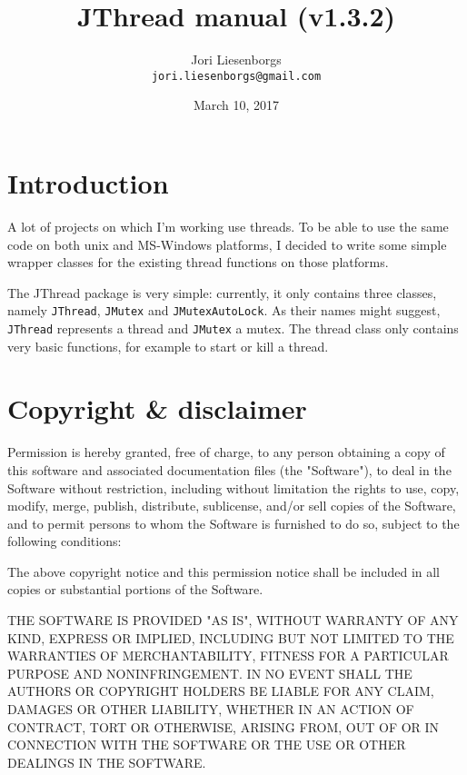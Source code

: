 \documentclass[a4paper,12pt]{article}
\begin{document}
	\title{JThread manual (v1.3.2)}
	\author{Jori Liesenborgs\\
	        {\tt jori.liesenborgs@gmail.com} }
	\date{March 10, 2017}
	\maketitle

	\section{Introduction}

	A lot of projects on which I'm working use threads. To be able to
	use the same code on both unix and MS-Windows platforms, I decided
	to write some simple wrapper classes for the existing thread functions
	on those platforms.

	The JThread package is very simple: currently, it only contains three
	classes, namely {\tt JThread}, {\tt JMutex} and {\tt JMutexAutoLock}. 
	As their names might
	suggest, {\tt JThread} represents a thread and {\tt JMutex} a mutex.
	The thread class only contains very basic functions, for example to
	start or kill a thread.

	\section{Copyright \& disclaimer}

	Permission is hereby granted, free of charge, to any person obtaining a
	copy of this software and associated documentation files (the "Software"),
	to deal in the Software without restriction, including without limitation
	the rights to use, copy, modify, merge, publish, distribute, sublicense,
	and/or sell copies of the Software, and to permit persons to whom the
	Software is furnished to do so, subject to the following conditions:

	The above copyright notice and this permission notice shall be included
	in all copies or substantial portions of the Software.

	THE SOFTWARE IS PROVIDED "AS IS", WITHOUT WARRANTY OF ANY KIND, EXPRESS
	OR IMPLIED, INCLUDING BUT NOT LIMITED TO THE WARRANTIES OF MERCHANTABILITY,
	FITNESS FOR A PARTICULAR PURPOSE AND NONINFRINGEMENT.  IN NO EVENT SHALL
	THE AUTHORS OR COPYRIGHT HOLDERS BE LIABLE FOR ANY CLAIM, DAMAGES OR OTHER
	LIABILITY, WHETHER IN AN ACTION OF CONTRACT, TORT OR OTHERWISE, ARISING
	FROM, OUT OF OR IN CONNECTION WITH THE SOFTWARE OR THE USE OR OTHER DEALINGS
	IN THE SOFTWARE.
\end{document}
